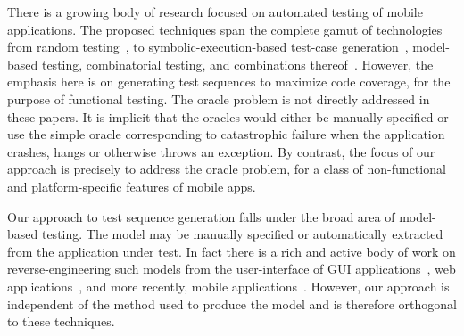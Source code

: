 There is a growing body of research focused on automated testing of mobile applications. The proposed techniques span the complete gamut of technologies from random testing~\cite{Hu:2011:AST,Dynodroid:2013}, to symbolic-execution-based test-case generation~\cite{AnandFSE2012, MirzaeiJPF2012}, model-based testing, combinatorial testing, and combinations thereof~\cite{Nguyen:2012:ISSTA, collider2013}. However, the emphasis here is on generating test sequences to maximize code coverage, for the purpose of functional testing. The oracle problem is not directly addressed in these papers. It is implicit that the oracles would either be manually specified or use the simple oracle corresponding to catastrophic failure when the application crashes, hangs or otherwise throws an exception. By contrast, the focus of our approach is precisely to address the oracle problem, for a class of non-functional and platform-specific features of mobile apps. 

Our approach to test sequence generation falls under the broad area of model-based testing. The model may be manually specified or automatically extracted from the application under test. In fact there is a rich and active body of work on reverse-engineering such models from the user-interface of GUI applications~\cite{MemonWCRE2003}, web applications~\cite{Mesbah:2012:TWEB}, and more recently, mobile applications~\cite{AmalfitanoASE2012, Joorabchi:2012:WCRE, YangFASE2013}. However, our approach is independent of the method used to produce the model and is therefore orthogonal to these techniques.

